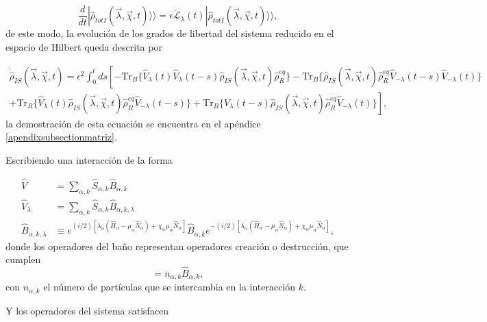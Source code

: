 \begin{equation}
    \frac{d}{dt}|\hat{\rho}_{totI}(\vec{\lambda},\vec{\chi},t)\rangle \rangle  = \epsilon \check{\mathcal{L}}_{\lambda}(t)|\hat{\rho}_{totI}(\vec{\lambda},\vec{\chi},t)\rangle \rangle,
 \label{sec2FCS:evolution}
\end{equation}
de este modo, la evolución de los grados de libertad del sistema reducido en el espacio de Hilbert queda descrita por 

\begin{multline}
    \dot{\hat{\rho}}_{IS}(\vec{\lambda},\vec{\chi},t) =  \epsilon^{2}\int_{0}^{t}ds \left[- \text{Tr}_{B}\{\hat{V}_{\lambda}(t)\hat{V}_{\lambda}(t-s)\hat{\rho}_{IS}(\vec{\lambda},\vec{\chi},t)\hat{\rho}^{eq}_{R} \} - \text{Tr}_{B}\{\hat{\rho}_{IS}(\vec{\lambda},\vec{\chi},t)\hat{\rho}^{eq}_{R}\hat{V}_{-\lambda}(t-s)\hat{V}_{-\lambda}(t) \} \right.\\
    \left. + \text{Tr}_{B}\{\hat{V}_{\lambda}(t)\hat{\rho}_{IS}(\vec{\lambda},\vec{\chi},t)\hat{\rho}^{eq}_{R}\hat{V}_{-\lambda}(t-s) \} + \text{Tr}_{B}\{ \hat{V}_{\lambda}(t-s)\hat{\rho}_{IS}(\vec{\lambda},\vec{\chi},t)\hat{\rho}^{eq}_{R}\hat{V}_{-\lambda}(t) \}  \right],
\label{ecmaestraVlambda}
\end{multline}
la demostración de esta ecuación se encuentra en el apéndice \ref{apendixsubsectionmatriz}.

Escribiendo una interacción de la forma

\begin{align*}
    \hat{V} & = \sum_{\alpha,k}\hat{S}_{\alpha,k}\hat{B}_{\alpha,k} \\
    \hat{V}_{\lambda} & = \sum_{\alpha,k}\hat{S}_{\alpha,k}\hat{B}_{\alpha,k,\lambda} \\
    \hat{B}_{\alpha,k,\lambda} & \equiv e^{(i/2)[\lambda_{\alpha}(\hat{H}_{\alpha} - \mu_{\alpha}\hat{N}_{\alpha}) + \chi_{\alpha}\mu_{\alpha}\hat{N}_{\alpha}]}\hat{B}_{\alpha,k}e^{-(i/2)[\lambda_{\alpha}(\hat{H}_{\alpha} - \mu_{\alpha}\hat{N}_{\alpha}) + \chi_{\alpha}\mu_{\alpha}\hat{N}_{\alpha}]},  
\end{align*}
donde los operadores del baño representan operadores creación o destrucción, que cumplen  
\begin{equation*}
    [\hat{B}_{\alpha,k},\hat{N}_{\alpha}] = n_{\alpha,k}\hat{B}_{\alpha,k},
\end{equation*}
con $n_{\alpha,k}$ el número de part\'iculas que se intercambia en la interacción $k$.
 
Y los operadores del sistema satisfacen

